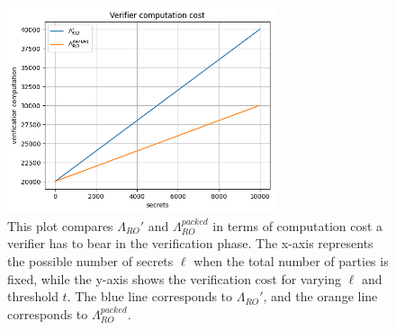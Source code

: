 \begin{figure}[H]
  \centering
  \includegraphics[width=0.7\textwidth]{figures/3pvss_verify_cost.png}
  \caption{This plot compares $\Lambda_{RO}'$ and $\Lambda_{RO}^{packed}$ in terms of computation cost  
  a verifier has to bear in the verification phase. 
  The x-axis represents the possible number of secrets $\ell$ when the total number of parties 
  is fixed, while the y-axis shows the verification cost for varying $\ell$ and threshold $t$. 
  The blue line corresponds to $\Lambda_{RO}'$, and the orange line corresponds to $\Lambda_{RO}^{packed}$.}
  \label{fig:3pvss_verify_cost}
\end{figure}